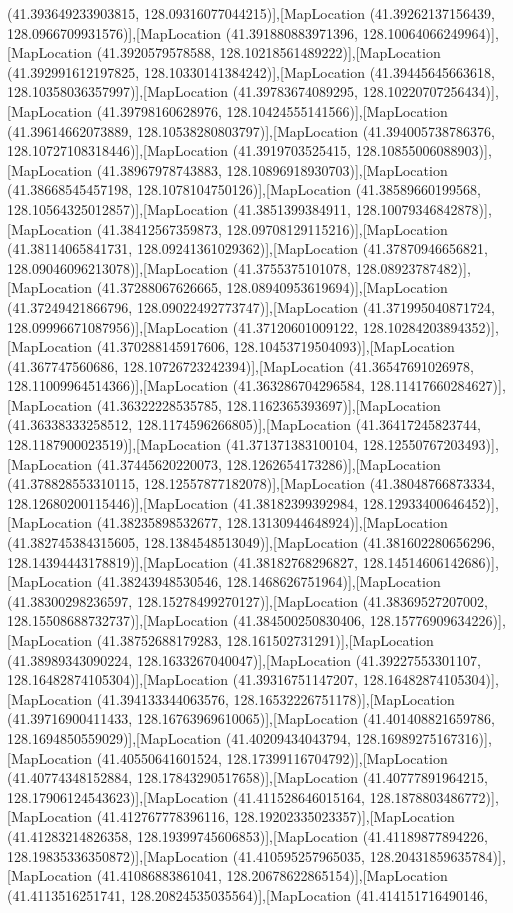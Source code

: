 (41.393649233903815, 128.09316077044215)],[MapLocation (41.39262137156439, 128.0966709931576)],[MapLocation (41.391880883971396, 128.10064066249964)],[MapLocation (41.3920579578588, 128.10218561489222)],[MapLocation (41.392991612197825, 128.10330141384242)],[MapLocation (41.39445645663618, 128.10358036357997)],[MapLocation (41.39783674089295, 128.10220707256434)],[MapLocation (41.39798160628976, 128.10424555141566)],[MapLocation (41.39614662073889, 128.10538280803797)],[MapLocation (41.394005738786376, 128.10727108318446)],[MapLocation (41.3919703525415, 128.10855006088903)],[MapLocation (41.38967978743883, 128.10896918930703)],[MapLocation (41.38668545457198, 128.1078104750126)],[MapLocation (41.38589660199568, 128.10564325012857)],[MapLocation (41.3851399384911, 128.10079346842878)],[MapLocation (41.38412567359873, 128.09708129115216)],[MapLocation (41.38114065841731, 128.09241361029362)],[MapLocation (41.37870946656821, 128.09046096213078)],[MapLocation (41.3755375101078, 128.08923787482)],[MapLocation (41.37288067626665, 128.08940953619694)],[MapLocation (41.37249421866796, 128.09022492773747)],[MapLocation (41.371995040871724, 128.09996671087956)],[MapLocation (41.37120601009122, 128.10284203894352)],[MapLocation (41.370288145917606, 128.10453719504093)],[MapLocation (41.367747560686, 128.10726723242394)],[MapLocation (41.36547691026978, 128.11009964514366)],[MapLocation (41.363286704296584, 128.11417660284627)],[MapLocation (41.36322228535785, 128.1162365393697)],[MapLocation (41.36338333258512, 128.1174596266805)],[MapLocation (41.36417245823744, 128.1187900023519)],[MapLocation (41.371371383100104, 128.12550767203493)],[MapLocation (41.37445620220073, 128.1262654173286)],[MapLocation (41.378828553310115, 128.12557877182078)],[MapLocation (41.38048766873334, 128.12680200115446)],[MapLocation (41.38182399392984, 128.12933400646452)],[MapLocation (41.38235898532677, 128.13130944648924)],[MapLocation (41.382745384315605, 128.1384548513049)],[MapLocation (41.381602280656296, 128.14394443178819)],[MapLocation (41.38182768296827, 128.14514606142686)],[MapLocation (41.38243948530546, 128.1468626751964)],[MapLocation (41.38300298236597, 128.15278499270127)],[MapLocation (41.38369527207002, 128.15508688732737)],[MapLocation (41.384500250830406, 128.15776909634226)],[MapLocation (41.38752688179283, 128.161502731291)],[MapLocation (41.38989343090224, 128.1633267040047)],[MapLocation (41.39227553301107, 128.16482874105304)],[MapLocation (41.39316751147207, 128.16482874105304)],[MapLocation (41.394133344063576, 128.16532226751178)],[MapLocation (41.39716900411433, 128.16763969610065)],[MapLocation (41.401408821659786, 128.1694850559029)],[MapLocation (41.40209434043794, 128.16989275167316)],[MapLocation (41.40550641601524, 128.17399116704792)],[MapLocation (41.40774348152884, 128.17843290517658)],[MapLocation (41.40777891964215, 128.17906124543623)],[MapLocation (41.411528646015164, 128.1878803486772)],[MapLocation (41.412767778396116, 128.19202335023357)],[MapLocation (41.41283214826358, 128.19399745606853)],[MapLocation (41.41189877894226, 128.19835336350872)],[MapLocation (41.410595257965035, 128.20431859635784)],[MapLocation (41.41086883861041, 128.20678622865154)],[MapLocation (41.4113516251741, 128.20824535035564)],[MapLocation (41.414151716490146, 